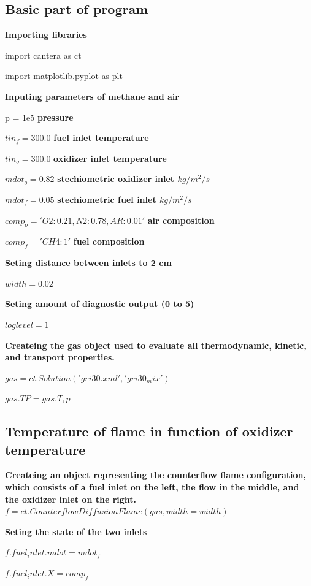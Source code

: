 \documentclass[a4paper]{article}
\begin{document}
\subsection{Basic part of program}

\textbf{Importing libraries}

import cantera as ct

import matplotlib.pyplot as plt

\textbf{Inputing parameters of methane and air}

p = 1e5   \textbf{pressure}

$tin_f = 300.0$   \textbf{fuel inlet temperature}

$tin_o = 300.0$   \textbf{oxidizer inlet temperature}

$mdot_o = 0.82$   \textbf{stechiometric oxidizer inlet $kg/m^2/s$}

$mdot_f = 0.05$   \textbf{stechiometric fuel inlet $kg/m^2/s$}

$comp_o = 'O2:0.21, N2:0.78, AR:0.01'$   \textbf{air composition}

$comp_f = 'CH4:1'$   \textbf{fuel composition}

\textbf{Seting distance between inlets to 2 cm}

$width = 0.02$

\textbf{Seting amount of diagnostic output (0 to 5)}

$loglevel = 1$

\textbf{Createing the gas object used to evaluate all thermodynamic, kinetic, and transport properties.}

$gas = ct.Solution('gri30.xml', 'gri30_mix')$

$gas.TP = gas.T, p$

\subsection{Temperature of flame in function of oxidizer temperature}

\textbf{Createing an object representing the counterflow flame configuration, which consists of a fuel inlet on the left, the flow in the middle, and the oxidizer inlet on the right.}
\hspace{5,35mm}$f = ct.CounterflowDiffusionFlame(gas, width=width)$

\textbf{Seting the state of the two inlets}

$f.fuel_inlet.mdot = mdot_f$

$f.fuel_inlet.X = comp_f$
\end{document}
